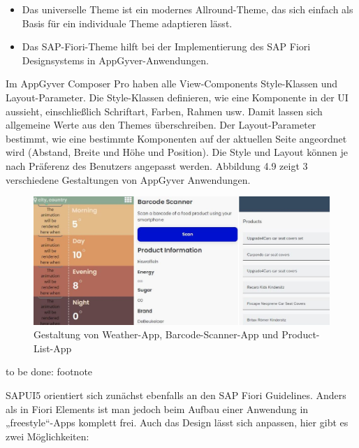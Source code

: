 \begin{itemize}[noitemsep]
\item Das universelle Theme ist ein modernes Allround-Theme, das sich einfach als Basis für ein individuale Theme adaptieren lässt.
\item Das SAP-Fiori-Theme hilft bei der Implementierung des SAP Fiori Designsystems in AppGyver-Anwendungen\cite{har:new}.
\end{itemize}

Im AppGyver Composer Pro haben alle View-Components Style-Klassen und Layout-Parameter. Die Style-Klassen definieren, wie eine Komponente in der UI aussieht, einschließlich Schriftart, Farben, Rahmen usw. Damit lassen sich allgemeine Werte aus den Themes überschreiben. Der Layout-Parameter bestimmt, wie eine bestimmte Komponenten auf der aktuellen Seite angeordnet wird (Abstand, Breite und Höhe und Position). Die Style und Layout können je nach Präferenz des Benutzers angepasst werden. Abbildung 4.9 zeigt 3 verschiedene Gestaltungen von AppGyver Anwendungen.

\begin{figure}[htbp]
 \centering
 \includegraphics[width=1.0\textwidth]{Bilder/appgyver/4_9_1_gestaltung.jpg}
 \caption{Gestaltung von Weather-App, Barcode-Scanner-App  und Product-List-App}
\end{figure}

to be done: footnote

SAPUI5 orientiert sich zunächst ebenfalls an den SAP Fiori Guidelines. Anders als in Fiori Elements ist man jedoch beim Aufbau einer Anwendung in „freestyle“-Apps komplett frei. Auch das Design lässt sich anpassen, hier gibt es zwei Möglichkeiten:

